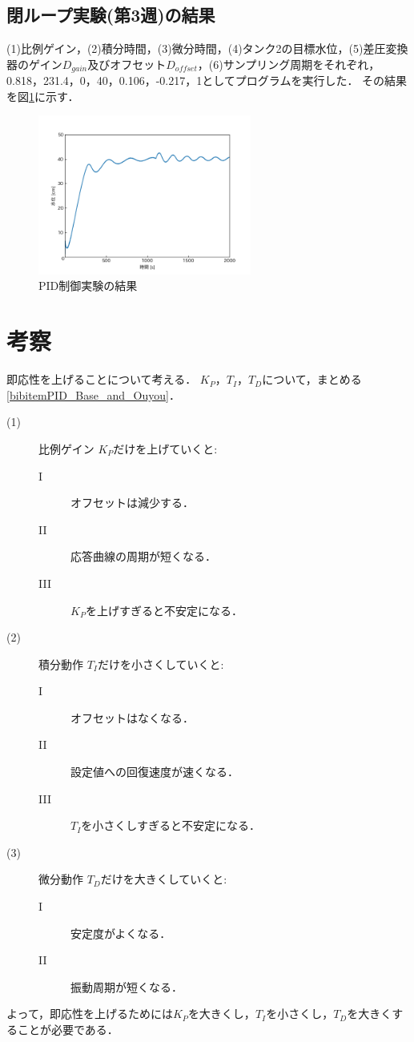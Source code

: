 \documentclass[12pt]{jsarticle}
\begin{document}
\subsection{閉ループ実験(第3週)の結果}
(1)比例ゲイン，(2)積分時間，(3)微分時間，(4)タンク2の目標水位，(5)差圧変換器のゲイン$D_{gain}$及びオフセット$D_{offset}$，(6)サンプリング周期をそれぞれ，0.818，231.4，0，40，0.106，-0.217，1としてプログラムを実行した．
その結果を図\ref{PIDExp}に示す．
\begin{figure}[tb]
  \begin{center}
    \includegraphics[clip,width=7.0cm]{../graph/PID_controll.png}
    \caption{PID制御実験の結果}
    \label{PIDExp}
  \end{center}
\end{figure}
\section{考察}
即応性を上げることについて考える．
$K_P$，$T_I$，$T_D$について，まとめる\ref{bibitemPID_Base_and_Ouyou}．
\begin{description}
\item[(1)] 比例ゲイン
  $K_P$だけを上げていくと:
  \begin{description}
  \item[I] オフセットは減少する．
  \item[II] 応答曲線の周期が短くなる．
  \item[III] $K_P$を上げすぎると不安定になる．
  \end{description}
\item[(2)] 積分動作
  $T_I$だけを小さくしていくと:
  \begin{description}
  \item[I] オフセットはなくなる．
  \item[II] 設定値への回復速度が速くなる．
  \item[III] $T_I$を小さくしすぎると不安定になる．
  \end{description}
\item[(3)] 微分動作
  $T_D$だけを大きくしていくと:
  \begin{description}
  \item[I] 安定度がよくなる．
  \item[II] 振動周期が短くなる．
  \end{description}
\end{description}
よって，即応性を上げるためには$K_P$を大きくし，$T_I$を小さくし，$T_D$を大きくすることが必要である．
\end{document}
